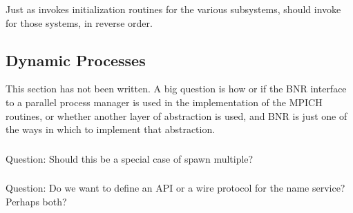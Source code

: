 \documentclass{article}
\begin{document}
Just as  invokes initialization routines for
the various subsystems,  should invoke
 for those systems, in reverse order.

\subsection{Dynamic Processes}
\label{sec:spawn}

This section has not been written.  A big question is how or if the BNR
interface to a parallel process manager is used in the implementation
of the MPICH routines, or whether another layer of abstraction is
used, and BNR is just one of the ways in which to implement that abstraction.

\subsubsection{}

\subsubsection{}

\subsubsection{}

\subsubsection{}

\subsubsection{}
Question:  Should this be a special case of spawn multiple?

\subsubsection{}

\subsubsection{}
Question:  Do we want to define an API or a wire protocol for the name
service?  Perhaps both?
\end{document}
